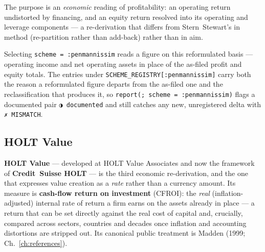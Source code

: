 \documentclass[11pt,a4paper]{report}
\newcommand{\statmark}[1]{{\symbolfont #1}}
\begin{document}
The purpose is an \emph{economic} reading of profitability: an operating return undistorted by financing, and
an equity return resolved into its operating and leverage components --- a re-derivation that differs from
Stern~Stewart's in method (re-partition rather than add-back) rather than in aim.

Selecting \texttt{scheme = :penmannissim} reads a figure on this reformulated basis --- operating income and
net operating assets in place of the as-filed profit and equity totals. The entries under
\texttt{SCHEME\_REGISTRY[:penmannissim]} carry both the reason a reformulated figure departs from the as-filed
one and the reclassification that produces it, so \texttt{report(; scheme = :penmannissim)} flags a documented
pair \texttt{\statmark{◑}~documented} and still catches any new, unregistered delta with \texttt{\statmark{✗}~MISMATCH}.

\subsection{HOLT Value}
\label{sec:schemes-holt}

\textbf{HOLT Value} --- developed at HOLT Value Associates and now the framework of \textbf{Credit~Suisse
HOLT} --- is the third economic re-derivation, and the one that expresses value creation as a \emph{rate}
rather than a currency amount. Its measure is \textbf{cash-flow return on investment} (CFROI): the \emph{real}
(inflation-adjusted) internal rate of return a firm earns on the assets already in place --- a return that can
be set directly against the real cost of capital and, crucially, compared across sectors, countries and decades
once inflation and accounting distortions are stripped out. Its canonical public treatment is Madden (1999;
Ch.~\ref{ch:references}).
\end{document}
